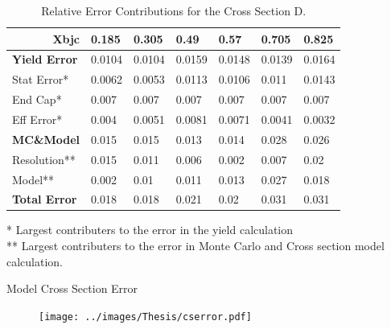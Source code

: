 \documentclass[12pt,usenames,dvipsnames]{beamer}
\begin{document}
\begin{frame}{}

\begin{table}[]
	\caption*{Relative Error Contributions for the Cross Section D.}
	\begin{tabular}{|p{2.2cm}|l|l|l|l|l|l|}


\hline
\multicolumn{1}{|r|}{\textbf{Xbjc}} & \textbf{0.185} & \textbf{0.305} & \textbf{0.49} & \textbf{0.57} & \textbf{0.705} & \textbf{0.825} \\ \hline
\textbf{Yield Error}                & 0.0104         & 0.0104         & 0.0159        & 0.0148        & 0.0139         & 0.0164         \\ \hline
Stat Error*                           & 0.0062         & 0.0053         & 0.0113        & 0.0106        & 0.011          & 0.0143         \\ \hline
End Cap*                             & 0.007          & 0.007          & 0.007         & 0.007         & 0.007          & 0.007          \\ \hline
Eff Error*                             & 0.004          & 0.0051         & 0.0081        & 0.0071        & 0.0041         & 0.0032         \\ \hline
\hline
\textbf{MC\&Model}                  & 0.015          & 0.015          & 0.013         & 0.014         & 0.028          & 0.026          \\ \hline
Resolution**                          & 0.015          & 0.011          & 0.006         & 0.002         & 0.007          & 0.02           \\ \hline
Model**                               & 0.002          & 0.01           & 0.011         & 0.013         & 0.027          & 0.018          \\ \hline
\hline
\textbf{Total Error}                & 0.018          & 0.018          & 0.021         & 0.02          & 0.031          & 0.031          \\ \hline
\end{tabular}
	* Largest contributers to the error in the yield calculation\\
** Largest contributers to the error in Monte Carlo and Cross section model calculation. 
\end{table}
\end{frame}

\begin{frame}{Model Cross Section Error}
\vspace{-1.25cm}
\begin{figure}
	\texttt{[image: ../images/Thesis/cserror.pdf]}
\end{figure}
\end{frame}
\end{document}
